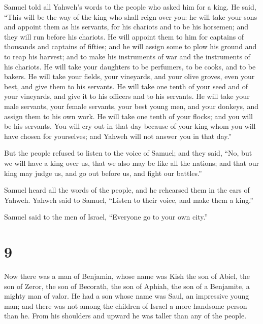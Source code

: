  Samuel told all Yahweh's words to the people who asked him
for a king.  He said, ``This will be the way of the king
who shall reign over you: he will take your sons and appoint them as his
servants, for his chariots and to be his horsemen; and they will run
before his chariots.  He will appoint them to him for
captains of thousands and captains of fifties; and he will assign some
to plow his ground and to reap his harvest; and to make his instruments
of war and the instruments of his chariots.  He will take
your daughters to be perfumers, to be cooks, and to be bakers.
 He will take your fields, your vineyards, and your olive
groves, even your best, and give them to his servants.  He
will take one tenth of your seed and of your vineyards, and give it to
his officers and to his servants.  He will take your male
servants, your female servants, your best young men, and your donkeys,
and assign them to his own work.  He will take one tenth of
your flocks; and you will be his servants.  You will cry
out in that day because of your king whom you will have chosen for
yourselves; and Yahweh will not answer you in that day.''

 But the people refused to listen to the voice of Samuel;
and they said, ``No, but we will have a king over us,  that
we also may be like all the nations; and that our king may judge us, and
go out before us, and fight our battles.''

 Samuel heard all the words of the people, and he rehearsed
them in the ears of Yahweh.  Yahweh said to Samuel,
``Listen to their voice, and make them a king.''

Samuel said to the men of Israel, ``Everyone go to your own city.''

\hypertarget{section-8}{%
\section{9}\label{section-8}}

 Now there was a man of Benjamin, whose name was Kish the
son of Abiel, the son of Zeror, the son of Becorath, the son of Aphiah,
the son of a Benjamite, a mighty man of valor.  He had a son
whose name was Saul, an impressive young man; and there was not among
the children of Israel a more handsome person than he. From his
shoulders and upward he was taller than any of the people.

